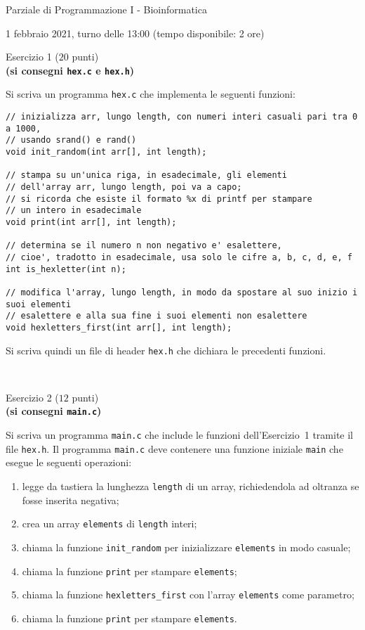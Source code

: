 \documentclass[12pt]{article}
\begin{document}
\begin{center}{\LARGE Parziale di Programmazione I - Bioinformatica}\\
\begin{center}
  \large 1 febbraio 2021, turno delle 13:00 (tempo disponibile: 2 ore)
\end{center}
\end{center}

\vspace*{1ex}
\begin{center}{\Large Esercizio 1} ($20$ punti)\\
  \textbf{(si consegni \texttt{hex.c} e \texttt{hex.h})}
\end{center}
Si scriva un programma \texttt{hex.c} che implementa le seguenti funzioni:
\begin{verbatim}
// inizializza arr, lungo length, con numeri interi casuali pari tra 0 a 1000,
// usando srand() e rand()
void init_random(int arr[], int length);

// stampa su un'unica riga, in esadecimale, gli elementi
// dell'array arr, lungo length, poi va a capo;
// si ricorda che esiste il formato %x di printf per stampare
// un intero in esadecimale
void print(int arr[], int length);

// determina se il numero n non negativo e' esalettere,
// cioe', tradotto in esadecimale, usa solo le cifre a, b, c, d, e, f
int is_hexletter(int n);

// modifica l'array, lungo length, in modo da spostare al suo inizio i suoi elementi
// esalettere e alla sua fine i suoi elementi non esalettere
void hexletters_first(int arr[], int length);
\end{verbatim}
%
Si scriva quindi un file di header \texttt{hex.h} che dichiara le precedenti funzioni.

\mbox{}\\
\begin{center}{\Large Esercizio 2} ($12$ punti)\\
  \textbf{(si consegni \texttt{main.c})}\end{center}
%
Si scriva un programma \texttt{main.c} che include le funzioni dell'Esercizio~1 tramite
il file \texttt{hex.h}.
Il programma \texttt{main.c} deve contenere una funzione iniziale \texttt{main} che esegue
le seguenti operazioni:
\begin{enumerate}
\item legge da tastiera la lunghezza \texttt{length} di un array, richiedendola ad oltranza se fosse inserita negativa;
\item crea un array \texttt{elements} di \texttt{length} interi;
\item chiama la funzione \texttt{init\_random} per inizializzare \texttt{elements} in modo casuale;
\item chiama la funzione \texttt{print} per stampare \texttt{elements};
\item chiama la funzione \texttt{hexletters\_first} con l'array \texttt{elements} come parametro;
\item chiama la funzione \texttt{print} per stampare \texttt{elements}.
\end{enumerate}
\end{document}
